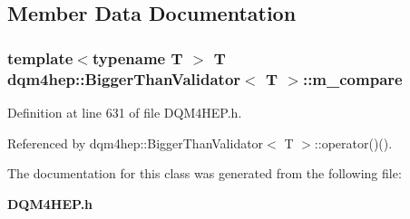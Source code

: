 \subsection{Member Data Documentation}
\subsubsection[{m\+\_\+compare}]{\setlength{\rightskip}{0pt plus 5cm}template$<$typename T $>$ T {\bf dqm4hep\+::\+Bigger\+Than\+Validator}$<$ T $>$\+::m\+\_\+compare\hspace{0.3cm}{\ttfamily [private]}}\label{classdqm4hep_1_1BiggerThanValidator_a7e59d73826d3989acffd0bd80e683d14}


Definition at line 631 of file D\+Q\+M4\+H\+E\+P.\+h.



Referenced by dqm4hep\+::\+Bigger\+Than\+Validator$<$ T $>$\+::operator()().



The documentation for this class was generated from the following file\+:\begin{DoxyCompactItemize}
\item 
{\bf D\+Q\+M4\+H\+E\+P.\+h}\end{DoxyCompactItemize}
